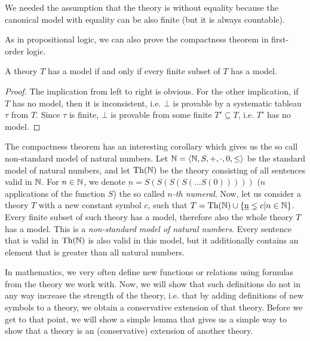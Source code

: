 We needed the assumption that the theory is without equality because the canonical model with equality can be also finite (but it is always countable).

As in propositional logic, we can also prove the compactness theorem in first-order logic.

\begin{theorem}[compactness]
A theory $T$ has a model if and only if every finite subset of $T$ has a model.
\end{theorem}
\begin{proof}
The implication from left to right is obvious. For the other implication, if $T$ has no model, then it is inconsistent, i.e. $\bot$ is provable by a systematic tableau $\tau$ from $T$. Since $\tau$ is finite, $\bot$ is provable from some finite $T' \subseteq T$, i.e. $T'$ has no model.
\end{proof}

The compactness theorem has an interesting corollary which gives us the so call non-standard model of natural numbers. Let $\mathbb{N} = \langle \mathbb{N}, S, +, \cdot, 0, \leq \rangle$ be the standard model of natural numbers, and let $\operatorname{Th}(\mathbb{N})$ be the theory consisting of all sentences valid in $\mathbb{N}$. For $n \in \mathbb{N}$, we denote $\underbar{n} = S(S(S(S(... S(0)))))$ ($n$ applications of the function $S$) the so called \emph{$n$-th numeral}. Now, let us consider a theory $T$ with a new constant symbol $c$, such that $T = \operatorname{Th}(\mathbb{N}) \cup \{\underbar{n} \lneq c | n \in \mathbb{N}\}$. Every finite subset of such theory has a model, therefore also the whole theory $T$ has a model. This is a \emph{non-standard model of natural numbers}. Every sentence that is valid in $\operatorname{Th}(\mathbb{N})$ is also valid in this model, but it additionally contains an element that is greater than all natural numbers.

In mathematics, we very often define new functions or relations using formulas from the theory we work with. Now, we will show that such definitions do not in any way increase the strength of the theory, i.e. that by adding definitions of new symbols to a theory, we obtain a conservative extension of that theory. Before we get to that point, we will show a simple lemma that gives us a simple way to show that a theory is an (conservative) extension of another theory.

